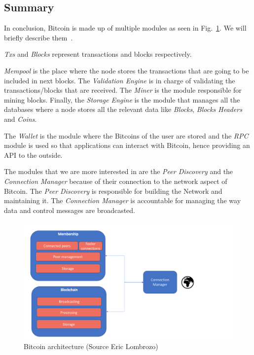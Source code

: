 \subsection{Summary}
In conclusion, Bitcoin is made up of multiple modules as seen in  Fig.~\ref{fig:bitcoinoverview}. We will briefly describe them~\cite{bitcoinwiki}.

\textit{Txs} and \textit{Blocks} represent transactions and blocks respectively.

\textit{Mempool} is the place where the node stores the transactions that are going to be included in next blocks. The \textit{Validation Engine} is in charge of validating the transactions/blocks that are received. The \textit{Miner} is the module responsible for mining blocks. Finally, the \textit{Storage Engine} is the module that manages all the databases where a node stores all the relevant data like \textit{Blocks}, \textit{Blocks Headers} and \textit{Coins}.

The \textit{Wallet} is the module where the Bitcoins of the user are stored and the \textit{RPC} module is used so that applications can interact with Bitcoin, hence providing an API to the outside.

The modules that we are more interested in are the \textit{Peer Discovery} and the \textit{Connection Manager} because of their connection to the network aspect of Bitcoin. The \textit{Peer Discovery} is responsible for building the Network and maintaining it. The \textit{Connection Manager} is accountable for managing the way data and control messages are broadcasted.

\begin{figure}[h]
\centering
\includegraphics[scale=0.4]{figs/My-Bitcoin-Core-architecture}
\caption{Bitcoin architecture (Source Eric Lombrozo)}
\label{fig:bitcoinoverview}
\end{figure}

